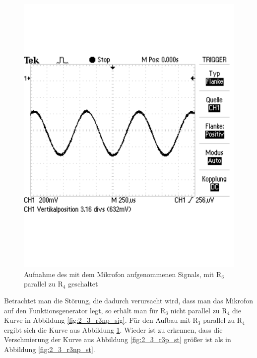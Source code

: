 \documentclass[12pt,a4paper]{article}
\begin{document}
\begin{figure}[H] 
  \centering
    \includegraphics[scale = 0.4]{2_3_r3p_sig.pdf}
  	\caption[Aufnahme des mit dem Mikrofon aufgenommenen Signals, mit R$_3$ parallel zu R$_4$ geschaltet]{Aufnahme des mit dem Mikrofon aufgenommenen Signals, mit R$_3$ parallel zu R$_4$ geschaltet}
  \label{fig:2_3_r3p_sig}
\end{figure}

Betrachtet man die Störung, die dadurch verursacht wird, dass man das Mikrofon auf den Funktionsgenerator legt, so erhält man für R$_3$ nicht parallel zu R$_4$ die Kurve in Abbildung \ref{fig:2_3_r3np_sig}. Für den Aufbau mit R$_3$ parallel zu R$_4$ ergibt sich die Kurve aus Abbildung \ref{fig:2_3_r3p_sig}. Wieder ist zu erkennen, dass die Verschmierung der Kurve aus Abbildung \ref{fig:2_3_r3p_st} größer ist als in Abbildung \ref{fig:2_3_r3np_st}.
\end{document}
